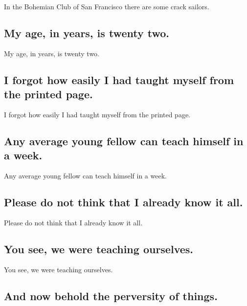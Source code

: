 \documentclass[]{article}
\begin{document}
In the Bohemian Club of San Francisco there are some crack sailors.

\hypertarget{my-age-in-years-is-twenty-two.}{%
\subsection{My age, in years, is twenty
two.}\label{my-age-in-years-is-twenty-two.}}

My age, in years, is twenty two.

\hypertarget{i-forgot-how-easily-i-had-taught-myself-from-the-printed-page.}{%
\subsection{I forgot how easily I had taught myself from the printed
page.}\label{i-forgot-how-easily-i-had-taught-myself-from-the-printed-page.}}

I forgot how easily I had taught myself from the printed page.

\hypertarget{any-average-young-fellow-can-teach-himself-in-a-week.}{%
\subsection{Any average young fellow can teach himself in a
week.}\label{any-average-young-fellow-can-teach-himself-in-a-week.}}

Any average young fellow can teach himself in a week.

\hypertarget{please-do-not-think-that-i-already-know-it-all.}{%
\subsection{Please do not think that I already know it
all.}\label{please-do-not-think-that-i-already-know-it-all.}}

Please do not think that I already know it all.

\hypertarget{you-see-we-were-teaching-ourselves.}{%
\subsection{You see, we were teaching
ourselves.}\label{you-see-we-were-teaching-ourselves.}}

You see, we were teaching ourselves.

\hypertarget{and-now-behold-the-perversity-of-things.}{%
\subsection{And now behold the perversity of
things.}\label{and-now-behold-the-perversity-of-things.}}
\end{document}
